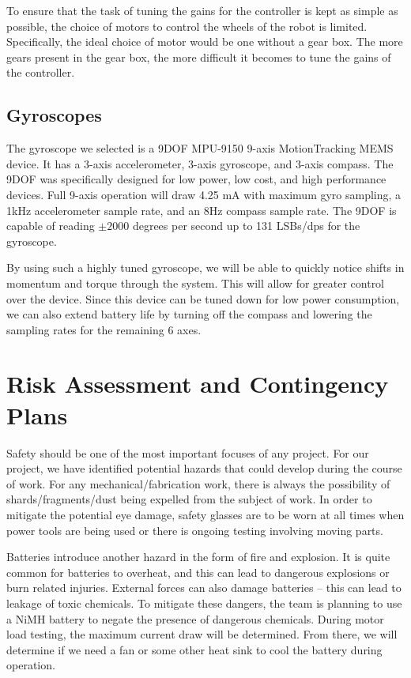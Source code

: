 \documentclass[11pt]{report}
\begin{document}
\begin{spacing}{1.5}
To ensure that the task of tuning the gains for the controller is kept as simple as possible, the choice of motors to control the wheels of the robot is limited.  Specifically, the ideal choice of motor would be one without a gear box.  The more gears present in the gear box, the more difficult it becomes to tune the gains of the controller.

\subsection*{Gyroscopes}

The gyroscope we selected is a 9DOF MPU-9150 9-axis MotionTracking MEMS device.  It has a 3-axis accelerometer, 3-axis gyroscope, and 3-axis compass.  The 9DOF was specifically designed for low power, low cost, and high performance devices.  Full 9-axis operation will draw 4.25 mA with maximum gyro sampling, a 1kHz accelerometer sample rate, and an 8Hz compass sample rate.  The 9DOF is capable of reading $\pm2000$ degrees per second up to 131 LSBs/dps for the gyroscope.

By using such a highly tuned gyroscope, we will be able to quickly notice shifts in momentum and torque through the system.  This will allow for greater control over the device. Since this device can be tuned down for low power consumption, we can also extend battery life by turning off the compass and lowering the sampling rates for the remaining 6 axes.

\section*{Risk Assessment and Contingency Plans} %

Safety should be one of the most important focuses of any project. For our project, we have identified potential hazards that could develop during the course of work. For any mechanical/fabrication work, there is always the possibility of shards/fragments/dust being expelled from the subject of work. In order to mitigate the potential eye damage, safety glasses are to be worn at all times when power tools are being used or there is ongoing testing involving moving parts. 

Batteries introduce another hazard in the form of fire and explosion. It is quite common for batteries to overheat, and this can lead to dangerous explosions or burn related injuries. External forces can also damage batteries – this can lead to leakage of toxic chemicals. To mitigate these dangers, the team is planning to use a NiMH battery to negate the presence of dangerous chemicals. During motor load testing, the maximum current draw will be determined. From there, we will determine if we need a fan or some other heat sink to cool the battery during operation. 


\end{spacing}
\end{document}

